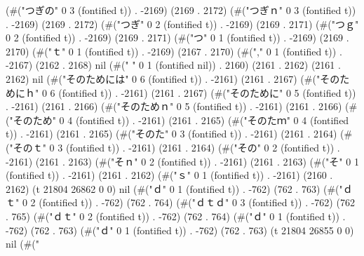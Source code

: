 (#("つぎの" 0 3 (fontified t)) . -2169) (2169 . 2172) (#("つぎｎ" 0 3 (fontified t)) . -2169) (2169 . 2172) (#("つぎ" 0 2 (fontified t)) . -2169) (2169 . 2171) (#("つｇ" 0 2 (fontified t)) . -2169) (2169 . 2171) (#("つ" 0 1 (fontified t)) . -2169) (2169 . 2170) (#("ｔ" 0 1 (fontified t)) . -2169) (2167 . 2170) (#("," 0 1 (fontified t)) . -2167) (2162 . 2168) nil (#(" " 0 1 (fontified nil)) . 2160) (2161 . 2162) (2161 . 2162) nil (#("そのためには" 0 6 (fontified t)) . -2161) (2161 . 2167) (#("そのためにｈ" 0 6 (fontified t)) . -2161) (2161 . 2167) (#("そのために" 0 5 (fontified t)) . -2161) (2161 . 2166) (#("そのためｎ" 0 5 (fontified t)) . -2161) (2161 . 2166) (#("そのため" 0 4 (fontified t)) . -2161) (2161 . 2165) (#("そのたｍ" 0 4 (fontified t)) . -2161) (2161 . 2165) (#("そのた" 0 3 (fontified t)) . -2161) (2161 . 2164) (#("そのｔ" 0 3 (fontified t)) . -2161) (2161 . 2164) (#("その" 0 2 (fontified t)) . -2161) (2161 . 2163) (#("そｎ" 0 2 (fontified t)) . -2161) (2161 . 2163) (#("そ" 0 1 (fontified t)) . -2161) (2161 . 2162) (#("ｓ" 0 1 (fontified t)) . -2161) (2160 . 2162) (t 21804 26862 0 0) nil (#("ｄ" 0 1 (fontified t)) . -762) (762 . 763) (#("ｄｔ" 0 2 (fontified t)) . -762) (762 . 764) (#("ｄｔｄ" 0 3 (fontified t)) . -762) (762 . 765) (#("ｄｔ" 0 2 (fontified t)) . -762) (762 . 764) (#("ｄ" 0 1 (fontified t)) . -762) (762 . 763) (#("ｄ" 0 1 (fontified t)) . -762) (762 . 763) (t 21804 26855 0 0) nil (#("%